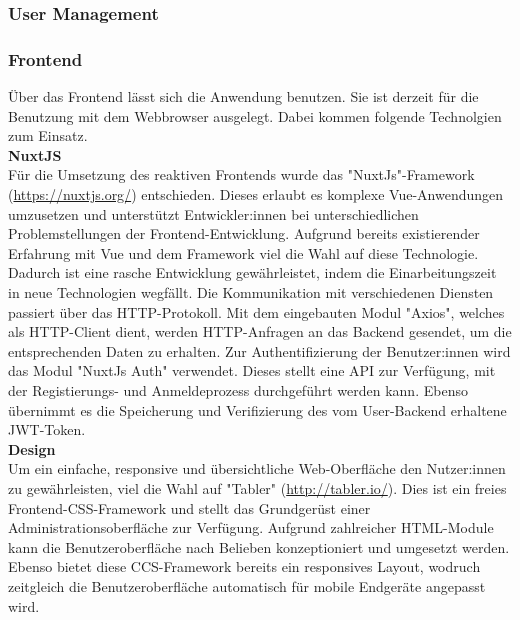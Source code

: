 \subsubsection{User Management}

\subsubsection{Frontend}

Über das Frontend lässt sich die Anwendung benutzen. Sie ist derzeit für die Benutzung mit dem Webbrowser ausgelegt. Dabei kommen folgende Technolgien zum Einsatz.  \\

\textbf{NuxtJS} \\

Für die Umsetzung des reaktiven Frontends wurde das "NuxtJs"-Framework (\href{https://nuxtjs.org/}{https://nuxtjs.org/}) entschieden. Dieses erlaubt es komplexe Vue-Anwendungen umzusetzen und unterstützt Entwickler:innen
bei unterschiedlichen Problemstellungen der Frontend-Entwicklung. Aufgrund bereits existierender Erfahrung mit Vue und dem Framework viel die Wahl auf diese Technologie.
Dadurch ist eine rasche Entwicklung gewährleistet, indem die Einarbeitungszeit in neue Technologien wegfällt. Die Kommunikation mit verschiedenen Diensten passiert
über das HTTP-Protokoll. Mit dem eingebauten Modul "Axios", welches als HTTP-Client dient, werden HTTP-Anfragen an das Backend gesendet, um die entsprechenden Daten 
zu erhalten. Zur Authentifizierung der Benutzer:innen wird das Modul "NuxtJs Auth" verwendet. Dieses stellt eine API zur Verfügung, mit der Registierungs- und Anmeldeprozess durchgeführt werden kann.
Ebenso übernimmt es die Speicherung und Verifizierung des vom User-Backend erhaltene JWT-Token. \\

\textbf{Design} \\

Um ein einfache, responsive und übersichtliche Web-Oberfläche den Nutzer:innen zu gewährleisten, viel die Wahl auf "Tabler" (\href{http://tabler.io/}{http://tabler.io/}). Dies ist ein freies Frontend-CSS-Framework
und stellt das Grundgerüst einer Administrationsoberfläche zur Verfügung. Aufgrund zahlreicher HTML-Module kann die Benutzeroberfläche nach Belieben konzeptioniert und 
umgesetzt werden. Ebenso bietet diese CCS-Framework bereits ein responsives Layout, wodruch zeitgleich die Benutzeroberfläche automatisch für mobile Endgeräte angepasst wird.

